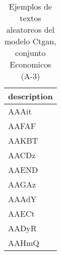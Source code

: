 \begin{table}[H]
\centering
\fontsize{8}{14}\selectfont
\caption{Ejemplos de textos aleatoreos del modelo Ctgan, conjunto Economicos (A-3)}
\label{table-sample10-economicos-a-3-ctgan-text}
\begin{tabular}{|m{50em}|}
\hline
\rowcolor[gray]{0.8}
description \\
\hline AAAit \\
\hline AAFAF \\
\hline AAKBT \\
\hline AACDz \\
\hline AAEND \\
\hline AAGAz \\
\hline AAAdY \\
\hline AAECt \\
\hline AADyR \\
\hline AAHmQ \\
\hline
\end{tabular}
\end{table}
